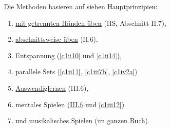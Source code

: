 Die Methoden basieren auf sieben Hauptprinzipien:

\begin{enumerate}[label={\arabic*.}] 
 \item \hyperref[c1ii7]{mit getrennten Händen üben} (HS, Abschnitt II.7),
 \item \hyperref[c1ii6]{abschnittsweise üben} (II.6),
 \item Entspannung (\hyperref[c1ii10]{\autoref{c1ii10}} und \hyperref[c1ii14]{\autoref{c1ii14}}),
 \item parallele Sets (\hyperref[c1ii11]{\autoref{c1ii11}}, \hyperref[c1iii7b]{\autoref{c1iii7b}}, \hyperref[c1iv2a]{\autoref{c1iv2a}})
 \item \hyperref[c1iii6]{Auswendiglernen} (III.6),
 \item mentales Spielen (\hyperref[c1iii6tastatur]{III.6} und \hyperref[c1iii12]{\autoref{c1iii12}})
 \item und musikalisches Spielen (im ganzen Buch).
\end{enumerate}

